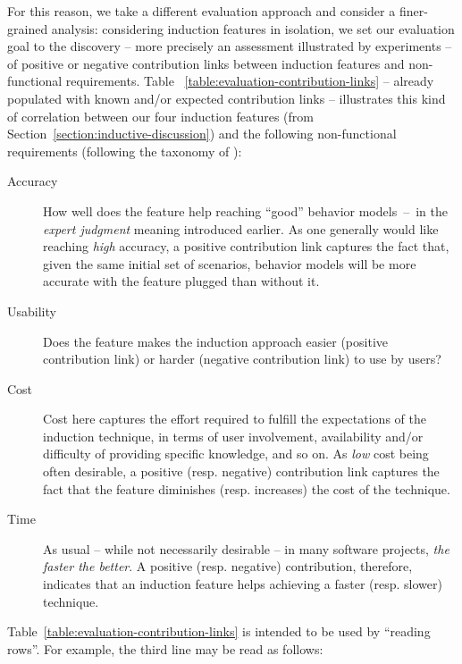 For this reason, we take a different evaluation approach and consider a finer-grained analysis: considering induction features in isolation, we set our evaluation goal to the discovery -- more precisely an assessment illustrated by experiments -- of positive or negative contribution links between induction features and non-functional requirements. Table ~\ref{table:evaluation-contribution-links} -- already populated with known and/or expected contribution links -- illustrates this kind of correlation between our four induction features (from Section~\ref{section:inductive-discussion}) and the following non-functional requirements (following the taxonomy of \cite{VanLamsweerde:2009}):

\begin{description}

\item[Accuracy] How well does the feature help reaching ``good'' behavior models~--~in the \emph{expert judgment} meaning introduced earlier. As one generally would like reaching \emph{high} accuracy, a positive contribution link captures the fact that, given the same initial set of scenarios, behavior models will be more accurate with the feature plugged than without it. 

\item[Usability] Does the feature makes the induction approach easier (positive contribution link) or harder (negative contribution link) to use by users?

\item[Cost] Cost here captures the effort required to fulfill the expectations of the induction technique, in terms of user involvement, availability and/or difficulty of providing specific knowledge, and so on. As \emph{low} cost being often desirable, a positive (resp. negative) contribution link captures the fact that the feature diminishes (resp. increases) the cost of the technique.

\item[Time] As usual -- while not necessarily desirable -- in many software projects, \emph{the faster the better}. A positive (resp. negative) contribution, therefore, indicates that an induction feature helps achieving a faster (resp. slower) technique.

\end{description}

Table~\ref{table:evaluation-contribution-links} is intended to be used by ``reading rows''. For example, the third line may be read as follows:

